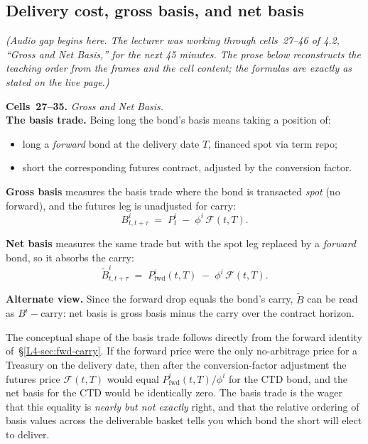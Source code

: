 \subsection{Delivery cost, gross basis, and net basis}\label{L4-sec:tf-basis}

\emph{(Audio gap begins here. The lecturer was working through cells~27--46
of 4.2, ``Gross and Net Basis,'' for the next 45 minutes. The prose below
reconstructs the teaching order from the frames and the cell content; the
formulas are exactly as stated on the live page.)}

\begin{keyblock}
\textbf{Cells~27--35.} \emph{Gross and Net Basis.}\\
\textbf{The basis trade.} Being long the bond's basis means taking a
position of:
\begin{itemize}
  \item long a \emph{forward} bond at the delivery date $T$, financed spot
        via term repo;
  \item short the corresponding futures contract, adjusted by the
        conversion factor.
\end{itemize}

\textbf{Gross basis} measures the basis trade where the bond is transacted
\emph{spot} (no forward), and the futures leg is unadjusted for carry:
\[
  B^i_{t,t+\tau} \;=\; P^i_t \;-\; \phi^i\,\mathcal{F}(t,T).
\]

\textbf{Net basis} measures the same trade but with the spot leg replaced
by a \emph{forward} bond, so it absorbs the carry:
\[
  \tilde B^i_{t,t+\tau} \;=\; P_{\text{fwd}}^i(t,T) \;-\; \phi^i\,\mathcal{F}(t,T).
\]

\textbf{Alternate view.} Since the forward drop equals the bond's carry,
$\tilde B$ can be read as $B^i - \text{carry}$: net basis is gross basis
minus the carry over the contract horizon.
\end{keyblock}

The conceptual shape of the basis trade follows directly from the forward
identity of~\S\ref{L4-sec:fwd-carry}. If the forward price were the only
no-arbitrage price for a Treasury on the delivery date, then after the
conversion-factor adjustment the futures price $\mathcal{F}(t,T)$ would
equal $P_{\text{fwd}}^i(t,T)/\phi^i$ for the CTD bond, and the net basis
for the CTD would be identically zero. The basis trade is the wager that
this equality is \emph{nearly but not exactly} right, and that the
relative ordering of basis values across the deliverable basket tells you
which bond the short will elect to deliver.

